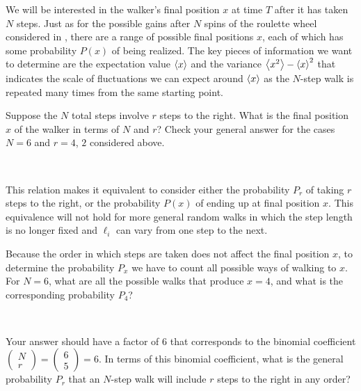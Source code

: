 We will be interested in the walker's final position $x$ at time $T$ after it has taken $N$ steps.
Just as for the possible gains after $N$ spins of the roulette wheel considered in , there are a range of possible final positions $x$, each of which has some probability $P(x)$ of being realized.
The key pieces of information we want to determine are the expectation value $\left\langle x \right\rangle$ and the variance $\left\langle x^2 \right\rangle - \left\langle x \right\rangle^2$ that indicates the scale of fluctuations we can expect around $\left\langle x \right\rangle$ as the $N$-step walk is repeated many times from the same starting point.

Suppose the $N$ total steps involve $r$ steps to the right.
What is the final position $x$ of the walker in terms of $N$ and $r$?
Check your general answer for the cases $N = 6$ and $r = 4$, $2$ considered above.
\begin{mdframed}
  \ \\[100 pt]
\end{mdframed}
This relation makes it equivalent to consider either the probability $P_r$ of taking $r$ steps to the right, or the probability $P(x)$ of ending up at final position $x$.
This equivalence will not hold for more general random walks in which the step length is no longer fixed and $\ell_i$ can vary from one step to the next.

\newpage %
Because the order in which steps are taken does not affect the final position $x$, to determine the probability $P_x$ we have to count all possible ways of walking to $x$.
For $N = 6$, what are all the possible walks that produce $x = 4$, and what is the corresponding probability $P_4$?
\begin{mdframed}
  \ \\[100 pt]
\end{mdframed}
Your answer should have a factor of $6$ that corresponds to the binomial coefficient $\left(\begin{array}{c}N \\ r\end{array}\right) = \left(\begin{array}{c}6 \\ 5\end{array}\right) = 6$.
In terms of this binomial coefficient, what is the general probability $P_r$ that an $N$-step walk will include $r$ steps to the right in any order?
\begin{mdframed}
  \ \\[100 pt]
\end{mdframed}

